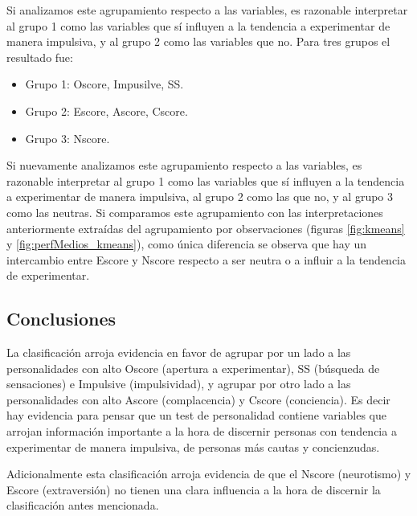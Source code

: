 \documentclass[a4paper,twocolumn]{article}
\begin{document}
Si analizamos este agrupamiento respecto a las variables, es razonable interpretar al grupo 1 como las variables que sí influyen a la tendencia a experimentar de manera impulsiva, y al grupo 2 como las variables que no. Para tres grupos el resultado fue:

\begin{itemize}
	\item Grupo 1: Oscore, Impusilve, SS.
	\item Grupo 2: Escore, Ascore, Cscore.
	\item Grupo 3: Nscore.
\end{itemize}

Si nuevamente analizamos este agrupamiento respecto a las variables, es razonable interpretar al grupo 1 como las variables que sí influyen a la tendencia a experimentar de manera impulsiva, al grupo 2 como las que no, y al grupo 3 como las neutras. Si comparamos este agrupamiento con las interpretaciones anteriormente extraídas del agrupamiento por observaciones (figuras \ref{fig:kmeans} y \ref{fig:perfMedios_kmeans}), como única diferencia se observa que hay un intercambio entre Escore y Nscore respecto a ser neutra o a influir a la tendencia de experimentar.




\subsection{Conclusiones}
La clasificación arroja evidencia en favor de agrupar por un lado a las personalidades con alto Oscore (apertura a experimentar), SS (búsqueda de sensaciones) e Impulsive (impulsividad), y agrupar por otro lado a las personalidades con alto Ascore (complacencia) y Cscore (conciencia). Es decir hay evidencia para pensar que un test de personalidad contiene variables que arrojan información importante a la hora de discernir personas con tendencia a experimentar de manera impulsiva, de personas más cautas y concienzudas. 

Adicionalmente esta clasificación arroja evidencia de que el Nscore (neurotismo) y Escore (extraversión) no tienen una clara influencia a la hora de discernir la clasificación antes mencionada.


\end{document}
